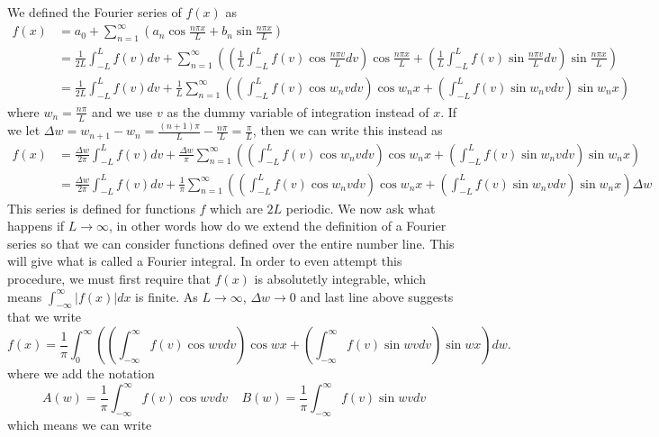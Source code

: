 We defined the Fourier series of $f(x)$ as 
\begin{align*}
f(x) 
&= a_0+\sum_{n=1}^\infty \left(a_n \cos\frac{n\pi x}{L}+b_n\sin \frac{n\pi x}{L}\right)\\
&= \frac{1}{2L}\int_{-L}^{L}f(v)dv+\sum_{n=1}^\infty \left(\left(\frac{1}{L}\int_{-L}^{L}f(v)\cos\frac{n\pi v}{L}dv\right) \cos\frac{n\pi x}{L}+\left(\frac{1}{L}\int_{-L}^{L}f(v)\sin\frac{n\pi v}{L}dv\right)\sin \frac{n\pi x}{L}\right)\\
&= \frac{1}{2L}\int_{-L}^{L}f(v)dv+\frac{1}{L}\sum_{n=1}^\infty \left(\left(\int_{-L}^{L} f(v)\cos w_n v dv\right) \cos w_n x+\left(\int_{-L}^{L}f(v)\sin w_n vdv\right)\sin w_n x\right)
\end{align*}
where $w_n=\frac{n\pi}{L}$ and we use $v$ as the dummy variable of integration instead of $x$.  If we let $\Delta w = w_{n+1}-w_{n} = \frac{(n+1)\pi}{L} - \frac{n\pi}{L} = \frac{\pi}{L}$, then we can write this instead as 
\begin{align*}
f(x) 
&= \frac{\Delta w}{2\pi}\int_{-L}^{L}f(v)dv+\frac{\Delta w}{\pi}\sum_{n=1}^\infty \left(\left(\int_{-L}^{L} f(v)\cos w_n v dv\right) \cos w_n x+\left(\int_{-L}^{L}f(v)\sin w_n vdv\right)\sin w_n x\right)\\
&= \frac{\Delta w}{2\pi}\int_{-L}^{L}f(v)dv+\frac{1}{\pi}\sum_{n=1}^\infty \left(\left(\int_{-L}^{L} f(v)\cos w_n v dv\right) \cos w_n x+\left(\int_{-L}^{L}f(v)\sin w_n vdv\right)\sin w_n x\right)\Delta w%
\end{align*}
This series is defined for functions $f$ which are $2L$ periodic.  We now ask what happens if $L\to \infty$, in other words how do we extend the definition of a Fourier series so that we can consider functions defined over the entire number line. This will give what is called a Fourier integral. In order to even attempt this procedure, we must first require that $f(x)$ is absolutetly integrable, which means $\int_{-\infty}^\infty |f(x)|dx$ is finite. As $L\to \infty$, $\Delta w\to 0$ and  last line above suggests that we write 
$$f(x) = \frac{1}{\pi}\int_{0}^\infty \left(\left(\int_{-\infty}^{\infty} f(v)\cos w v dv\right) \cos w x+\left(\int_{-\infty}^{\infty}f(v)\sin w vdv\right)\sin w x\right)dw.$$   
where we add the notation 
$$A(w) = \frac{1}{\pi}\int_{-\infty}^{\infty} f(v)\cos w v dv \ \ \ \ \ B(w) = \frac{1}{\pi}\int_{-\infty}^{\infty} f(v)\sin w v dv $$ which means we can write 
